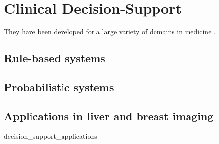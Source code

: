 \chapter{Clinical Decision-Support}

They have been developed for a large variety of domains in medicine \cite{Bright:2012ga,Garg:2005cb,Miller:1994cx,Kawamoto:2005gn}.


\section{Rule-based systems}

\section{Probabilistic systems}

\section{Applications in liver and breast imaging}
{decision_support_applications}





